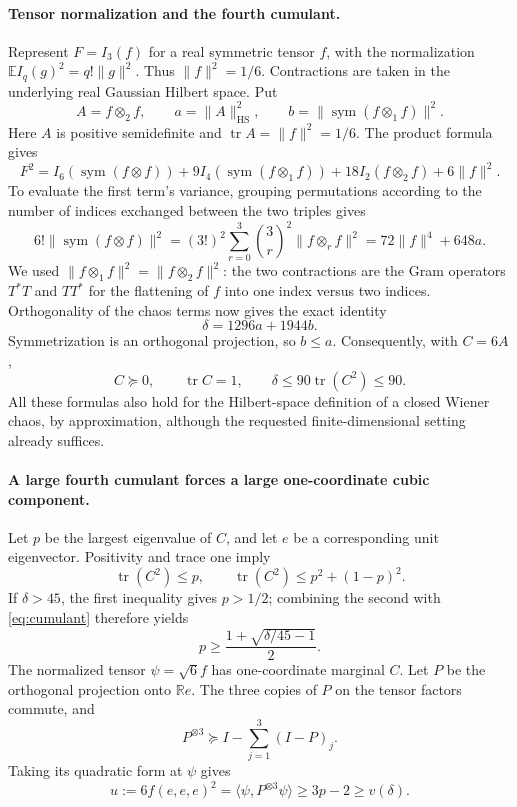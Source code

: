 \documentclass[11pt]{article}
\newcommand{\E}{\mathbb E}
\newcommand{\sym}{\operatorname{sym}}
\begin{document}
\paragraph{Tensor normalization and the fourth cumulant.}
Represent $F=I_3(f)$ for a real symmetric tensor $f$, with the normalization
$\E I_q(g)^2=q!\|g\|^2$. Thus $\|f\|^2=1/6$.
Contractions are taken in the underlying real Gaussian Hilbert space. Put
\[
 A=f\otimes_2f,\qquad a=\|A\|_{\mathrm{HS}}^2,
 \qquad b=\|\sym(f\otimes_1f)\|^2.
\]
Here $A$ is positive semidefinite and $\operatorname{tr}A=\|f\|^2=1/6$.
The product formula gives
\[
 F^2=I_6(\sym(f\otimes f))
       +9I_4(\sym(f\otimes_1f))+18I_2(f\otimes_2f)+6\|f\|^2.
\]
To evaluate the first term's variance, grouping permutations according to
the number of indices exchanged between the two triples gives
\[
 6!\|\sym(f\otimes f)\|^2
 =(3!)^2\sum_{r=0}^3\binom3r^2\|f\otimes_rf\|^2
 =72\|f\|^4+648a.
\]
We used $\|f\otimes_1f\|^2=\|f\otimes_2f\|^2$: the two contractions are
the Gram operators $T^*T$ and $TT^*$ for the flattening of $f$ into one
index versus two indices. Orthogonality of the chaos terms now gives the exact identity
\[
 \delta=1296a+1944b.
\]
Symmetrization is an orthogonal projection, so $b\leq a$. Consequently,
with $C=6A$,
\begin{equation}\label{eq:cumulant}
 C\succeq0,\qquad\operatorname{tr}C=1,
 \qquad \delta\leq90\operatorname{tr}(C^2)\leq90.
\end{equation}
All these formulas also hold for the Hilbert-space definition of a closed
Wiener chaos, by approximation, although the requested finite-dimensional
setting already suffices.

\paragraph{A large fourth cumulant forces a large one-coordinate cubic component.}
Let $p$ be the largest eigenvalue of $C$, and let $e$ be a corresponding unit
eigenvector. Positivity and trace one imply
\[
 \operatorname{tr}(C^2)\leq p,
 \qquad\operatorname{tr}(C^2)\leq p^2+(1-p)^2.
\]
If $\delta>45$, the first inequality gives $p>1/2$; combining the second
with \eqref{eq:cumulant} therefore yields
\begin{equation}\label{eq:p}
 p\geq\frac{1+\sqrt{\delta/45-1}}2.
\end{equation}
The normalized tensor $\psi=\sqrt6 f$ has one-coordinate marginal $C$.
Let $P$ be the orthogonal projection onto $\mathbb Re$. The three copies
of $P$ on the tensor factors commute, and
\[
 P^{\otimes3}\succeq I-\sum_{j=1}^3(I-P)_j.
\]
Taking its quadratic form at $\psi$ gives
\begin{equation}\label{eq:u}
 u:=6f(e,e,e)^2
   =\langle\psi,P^{\otimes3}\psi\rangle\geq3p-2\geq v(\delta).
\end{equation}
\end{document}
